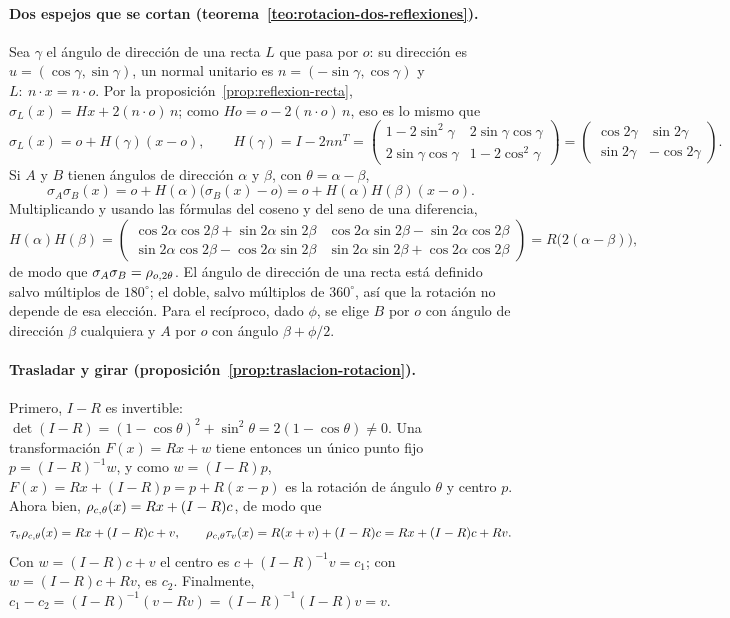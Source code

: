 \paragraph{Dos espejos que se cortan (teorema~\ref{teo:rotacion-dos-reflexiones}).}
\begin{demostracion}
Sea \(\gamma\) el ángulo de dirección de una recta \(L\) que pasa por \(o\): su dirección es
\(u=(\cos\gamma,\sin\gamma)\), un normal unitario es \(n=(-\sin\gamma,\cos\gamma)\) y
\(L:\ n\cdot x=n\cdot o\). Por la proposición~\ref{prop:reflexion-recta},
\(\sigma_{L}(x)=Hx+2(n\cdot o)\,n\); como \(Ho=o-2(n\cdot o)\,n\), eso es lo mismo que
\[
  \sigma_{L}(x)=o+H(\gamma)(x-o),
  \qquad
  H(\gamma)=I-2nn^T=
  \begin{pmatrix}
    1-2\sin^2\gamma & 2\sin\gamma\cos\gamma\\
    2\sin\gamma\cos\gamma & 1-2\cos^2\gamma
  \end{pmatrix}
  =
  \begin{pmatrix}
    \cos 2\gamma & \sin 2\gamma\\
    \sin 2\gamma &-\cos 2\gamma
  \end{pmatrix}.
\]
Si \(A\) y \(B\) tienen ángulos de dirección \(\alpha\) y \(\beta\), con
\(\theta=\alpha-\beta\),
\[
  \sigma_{A}\sigma_{B}(x)=o+H(\alpha)\bigl(\sigma_{B}(x)-o\bigr)=o+H(\alpha)H(\beta)(x-o).
\]
Multiplicando y usando las fórmulas del coseno y del seno de una diferencia,
\[
  H(\alpha)H(\beta)=
  \begin{pmatrix}
    \cos2\alpha\cos2\beta+\sin2\alpha\sin2\beta & \cos2\alpha\sin2\beta-\sin2\alpha\cos2\beta\\
    \sin2\alpha\cos2\beta-\cos2\alpha\sin2\beta & \sin2\alpha\sin2\beta+\cos2\alpha\cos2\beta
  \end{pmatrix}
  =R\bigl(2(\alpha-\beta)\bigr),
\]
de modo que \(\sigma_{A}\sigma_{B}=\rho_{o,2\theta}\). El ángulo de dirección de una recta está
definido salvo múltiplos de \(180^\circ\); el doble, salvo múltiplos de \(360^\circ\), así que
la rotación no depende de esa elección. Para el recíproco, dado \(\phi\), se elige \(B\) por
\(o\) con ángulo de dirección \(\beta\) cualquiera y \(A\) por \(o\) con ángulo
\(\beta+\phi/2\).
\end{demostracion}

\paragraph{Trasladar y girar (proposición~\ref{prop:traslacion-rotacion}).}
\begin{demostracion}
Primero, \(I-R\) es invertible:
\(\det(I-R)=(1-\cos\theta)^2+\sin^2\theta=2(1-\cos\theta)\neq0\). Una transformación
\(F(x)=Rx+w\) tiene entonces un único punto fijo \(p=(I-R)^{-1}w\), y como \(w=(I-R)p\),
\(F(x)=Rx+(I-R)p=p+R(x-p)\) es la rotación de ángulo \(\theta\) y centro \(p\). Ahora bien,
\(\rho_{c,\theta}(x)=Rx+(I-R)c\), de modo que
\[
  \tau_v\rho_{c,\theta}(x)=Rx+(I-R)c+v,
  \qquad
  \rho_{c,\theta}\tau_v(x)=R(x+v)+(I-R)c=Rx+(I-R)c+Rv .
\]
Con \(w=(I-R)c+v\) el centro es \(c+(I-R)^{-1}v=c_1\); con \(w=(I-R)c+Rv\), es \(c_2\).
Finalmente, \(c_1-c_2=(I-R)^{-1}(v-Rv)=(I-R)^{-1}(I-R)v=v\).
\end{demostracion}


